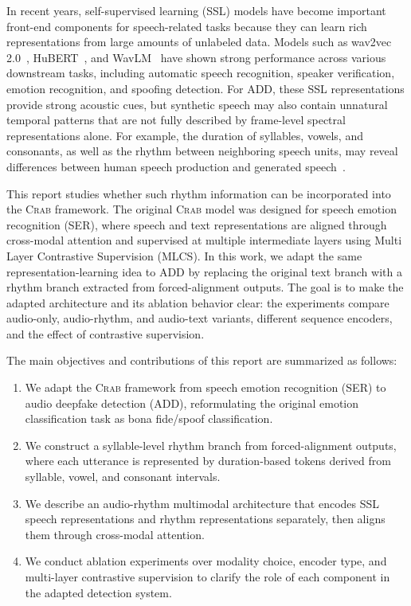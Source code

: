 \documentclass[12pt, a4paper, twocolumn]{article}
\newcommand{\crab}{\textsc{Crab}}
\begin{document}
In recent years, self-supervised learning (SSL) models have become important front-end components for speech-related tasks because they can learn rich representations from large amounts of unlabeled data.
Models such as wav2vec 2.0~\cite{baevski2020wav2vec2}, HuBERT~\cite{hsu2021hubert}, and WavLM~\cite{chen2022wavlm} have shown strong performance across various downstream tasks, including automatic speech recognition, speaker verification, emotion recognition, and spoofing detection.
For ADD, these SSL representations provide strong acoustic cues, but synthetic speech may also contain unnatural temporal patterns that are not fully described by frame-level spectral representations alone.
For example, the duration of syllables, vowels, and consonants, as well as the rhythm between neighboring speech units, may reveal differences between human speech production and generated speech~\cite{warren2025pitch,attorresi2022combining,wang2023crossdataset}.

This report studies whether such rhythm information can be incorporated into the \crab{} framework.
The original \crab{} model was designed for speech emotion recognition (SER), where speech and text representations are aligned through cross-modal attention and supervised at multiple intermediate layers using Multi Layer Contrastive Supervision (MLCS).
In this work, we adapt the same representation-learning idea to ADD by replacing the original text branch with a rhythm branch extracted from forced-alignment outputs.
The goal is to make the adapted architecture and its ablation behavior clear: the experiments compare audio-only, audio-rhythm, and audio-text variants, different sequence encoders, and the effect of contrastive supervision.


The main objectives and contributions of this report are summarized as follows:
\begin{enumerate}
    \item We adapt the \crab{} framework from speech emotion recognition (SER) to audio deepfake detection (ADD), reformulating the original emotion classification task as bona fide/spoof classification.
    \item We construct a syllable-level rhythm branch from forced-alignment outputs, where each utterance is represented by duration-based tokens derived from syllable, vowel, and consonant intervals.
    \item We describe an audio-rhythm multimodal architecture that encodes SSL speech representations and rhythm representations separately, then aligns them through cross-modal attention.
    \item We conduct ablation experiments over modality choice, encoder type, and multi-layer contrastive supervision to clarify the role of each component in the adapted detection system.
\end{enumerate}
\end{document}
